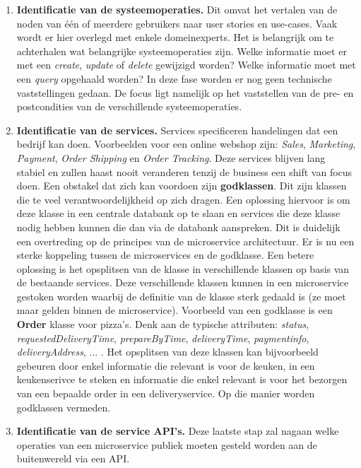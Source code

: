 	\begin{enumerate}
		\item[\info]\textbf{Identificatie van de systeemoperaties.} Dit omvat het vertalen van de noden van één of meerdere gebruikers naar user stories en use-cases. Vaak wordt er hier overlegd met enkele domeinexperts. Het is belangrijk om te achterhalen wat belangrijke systeemoperaties zijn. Welke informatie moet er met een \textit{create}, \textit{update} of \textit{delete} gewijzigd worden? Welke informatie moet met een \textit{query} opgehaald worden? In deze fase worden er nog geen technische vaststellingen gedaan. De focus ligt namelijk op het vaststellen van de pre- en postcondities van de verschillende systeemoperaties.
		
		\item[\info]\textbf{Identificatie van de services.} Services specificeren handelingen dat een bedrijf kan doen. Voorbeelden voor een online webshop zijn: \textit{Sales}, \textit{Marketing}, \textit{Payment}, \textit{Order Shipping} en \textit{Order Tracking}. Deze services blijven lang stabiel en zullen haast nooit veranderen tenzij de business een shift van focus doen. Een obstakel dat zich kan voordoen zijn \textbf{godklassen}. Dit zijn klassen die te veel verantwoordelijkheid op zich dragen. Een oplossing hiervoor is om deze klasse in een centrale databank op te slaan en services die deze klasse nodig hebben kunnen die dan via de databank aanspreken. Dit is duidelijk een overtreding op de principes van de microservice architectuur. Er is nu een sterke koppeling tussen de microservices en de godklasse. Een betere oplossing is het opsplitsen van de klasse in verschillende klassen op basis van de bestaande services. Deze verschillende klassen kunnen in een microservice gestoken worden waarbij de definitie van de klasse sterk gedaald is (ze moet maar gelden binnen de microservice). Voorbeeld van een godklasse is een \textbf{Order} klasse voor pizza's. Denk aan de typische attributen: \textit{status}, \textit{requestedDeliveryTime}, \textit{prepareByTime}, \textit{deliveryTime}, \textit{paymentinfo}, \textit{deliveryAddress}, ... . Het opsplitsen van deze klassen kan bijvoorbeeld gebeuren door enkel informatie die relevant is voor de keuken, in een keukenserivce te steken en informatie die enkel relevant is voor het bezorgen van een bepaalde order in een deliveryservice. Op die manier worden godklassen vermeden.
		
		\item[\info]\textbf{Identificatie van de service API's.} Deze laatste stap zal nagaan welke operaties van een microservice publiek moeten gesteld worden aan de buitenwereld via een API. 
	\end{enumerate}
